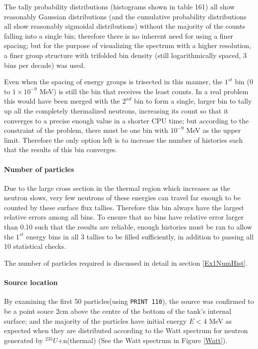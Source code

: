 \documentclass[a4paper, 12pt]{article}
\begin{document}
The tally probability distributions (histograms shown in table 161) all show reasonably Gaussian distributions (and the cumulative probability distributions all show reasonably sigmoidal distributions) without the majority of the counts falling into a single bin; therefore there is no inherent need for using a finer spacing; but for the purpose of visualizing the spectrum with a higher resolution, a finer group structure with trifolded bin density (still logarithmically spaced, 3 bins per decade) was used.

Even when the spacing of energy groups is trisected in this manner, the $1^{st}$ bin ($0$ to $1\times 10^{-9}$ MeV) is still the bin that receives the least counts. In a real problem this would have been merged with the $2^{nd}$ bin to form a single, larger bin to tally up all the completely thermalized neutrons, increasing its count so that it converges to a precise enough value in a shorter CPU time; but according to the constraint of the problem, there must be one bin with ${10^{-9}}$ MeV as the upper limit. Therefore the only option left is to increase the number of histories such that the results of this bin converges.

\paragraph{Number of particles}
Due to the large cross section in the thermal region which increases as the neutron slows, very few neutrons of these energies can travel far enough to be counted by these surface flux tallies. Therefore this bin always have the largest relative errors among all bins. To ensure that no bins have relative error larger than 0.10 such that the results are reliable, enough histories must be ran to allow the $1^{st}$ energy bins in all 3 tallies to be filled sufficiently, in addition to passing all 10 statistical checks.

The number of particles required is discussed in detail in section \ref{Ex1NumHist}.

\paragraph{Source location\indent}By examining the first 50 particles(using \texttt{PRINT 110}), the source was confirmed to be a point souce 2cm above the centre of the bottom of the tank's internal surface; and the majority of the particles have initial energy $E<4$ MeV as expected when they are distributed according to the Watt spectrum for neutron generated by ${}^{235}U$+n(thermal) (See the Watt spectrum in Figure \ref{Watt}).
\end{document}
